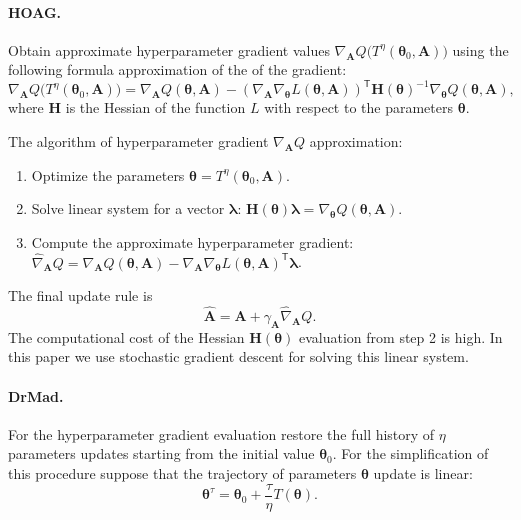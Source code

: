\documentclass[smallcondensed]{svjour3}
\begin{document}
\paragraph{HOAG.}
Obtain approximate hyperparameter gradient values  $\nabla_{\mathbf{A}} Q \bigl(T^\eta(\boldsymbol{\theta}_0, \mathbf{A})\bigr)$ using the following  formula approximation of the  of the gradient:
\[
\nabla_{\mathbf{A}} Q \bigl(T^\eta(\boldsymbol{\theta}_0, \mathbf{A})\bigr) = \nabla_{\mathbf{A}} Q(\boldsymbol{\theta}, \mathbf{A}) - (\nabla_{ \mathbf{A}}  \nabla_{\boldsymbol{\theta}} L(\boldsymbol{\theta}, \mathbf{A}))^\mathsf{T}\mathbf{H}(\boldsymbol{\theta})^{-1}\nabla_{\boldsymbol{\theta}} Q(\boldsymbol{\theta}, \mathbf{A}),
\]
where $\mathbf{H}$ is the Hessian of the function $L$ with respect to the parameters $\boldsymbol{\theta}$.

The algorithm of hyperparameter gradient $\nabla_{\mathbf{A}} Q$  approximation:
\begin{enumerate}
\item Optimize the parameters $\boldsymbol{\theta} = T^\eta(\boldsymbol{\theta}_0, \mathbf{A})$.
\item Solve linear system for a vector $\boldsymbol{\lambda}$: $\mathbf{H}(\boldsymbol{\theta})\boldsymbol{\lambda} =  \nabla_{\boldsymbol{\theta}} Q(\boldsymbol{\theta}, \mathbf{A})$.
\item Compute the approximate hyperparameter gradient: $\hat{\nabla}_{\mathbf{A}}Q = \nabla_{\mathbf{A}}Q(\boldsymbol{\theta}, \mathbf{A}) - \nabla_{ \mathbf{A}}  \nabla_{\boldsymbol{\theta}} L(\boldsymbol{\theta}, \mathbf{A})^\mathsf{T}\boldsymbol{\lambda}$.
\end{enumerate}

The final update rule is
\begin{equation}
\label{eq:update_hyper}
\hat{\mathbf{A}} = \mathbf{A} + \gamma_{\mathbf{A}} \hat{\nabla}_{\mathbf{A}}Q.
\end{equation}
The computational cost of the Hessian $\mathbf{H}(\boldsymbol{\theta})$ evaluation  from step 2 is high.  In this paper we use stochastic gradient descent for solving this linear system. 


\paragraph{DrMad.}
For the hyperparameter gradient evaluation restore the full history of $\eta$ parameters updates starting from the initial value $\boldsymbol{\theta}_0$.  For the simplification of this procedure suppose that the trajectory of parameters $\boldsymbol{\theta}$ update is linear:
\begin{equation}
\label{eq:mad_lin}
\boldsymbol{\theta}^\tau = \boldsymbol{\theta}_0 + \frac{\tau}{\eta} T(\boldsymbol{\theta}).
\end{equation}
\end{document}
